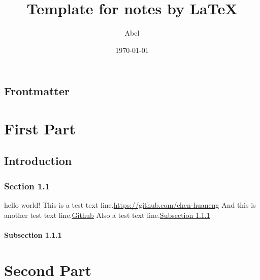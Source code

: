 \documentclass{note}
\begin{document}
\title{Template for notes by \LaTeX}
\author{Abel}
\date{\today}

%

\tableofcontents

\frontmatter

% 

\chapter{Frontmatter}
\lipsum[5-10]

\mainmatter

% 
% 
% 
% 
% 
% 

\part{First Part}

\chapter{Introduction}

\section{Section 1.1}

hello world!\cite{2015The} This is a test text line.\url{https://github.com/chen-huaneng} And this is another test text line.\href{https://github.com/chen-huaneng}{Github} Also a test text line.\hyperref[test]{Subsection 1.1.1}

\lipsum[5-10]

\subsection{Subsection 1.1.1}\label{test}

\lipsum[5-10]

\part{Second Part}
\end{document}
